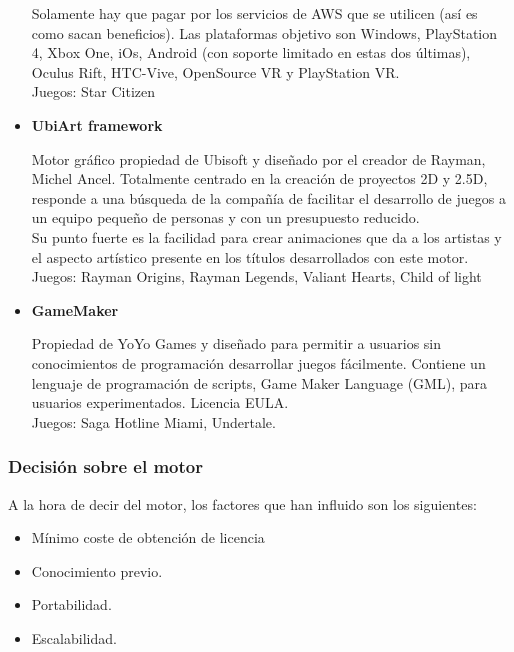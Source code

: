 \begin{itemize}
\quad Solamente hay que pagar por los servicios de AWS que se utilicen (así es como sacan beneficios). Las plataformas objetivo son Windows, PlayStation 4, Xbox One, iOs, Android (con soporte limitado en estas dos últimas), Oculus Rift, HTC-Vive, OpenSource VR y PlayStation VR.\\

\quad Juegos: Star Citizen\\

\item{\textbf{UbiArt framework}}

\quad Motor gráfico propiedad de Ubisoft y diseñado por el creador de Rayman, Michel Ancel. Totalmente centrado en la creación de proyectos 2D y 2.5D, responde a una
búsqueda de la compañía de facilitar el desarrollo de juegos a un equipo pequeño de personas y con un presupuesto reducido.\\

\quad Su punto fuerte es la facilidad para crear animaciones que da a los artistas y el aspecto artístico presente en los títulos desarrollados con este motor.\\

\quad Juegos: Rayman Origins, Rayman Legends, Valiant Hearts, Child of light \\

\item{\textbf{GameMaker}}

\quad Propiedad de YoYo Games y diseñado para permitir a usuarios sin conocimientos de programación desarrollar juegos fácilmente. Contiene un lenguaje de programación de scripts, Game Maker Language (GML), para usuarios experimentados. Licencia EULA.\\

\quad Juegos: Saga Hotline Miami, Undertale.\\
\end{itemize}

\newpage

\subsubsection{Decisión sobre el motor}

\quad A la hora de decir del motor, los factores que han influido son los siguientes:

\begin{itemize}
\item Mínimo coste de obtención de licencia
\item Conocimiento previo.
\item Portabilidad.
\item Escalabilidad.	
\end{itemize}

